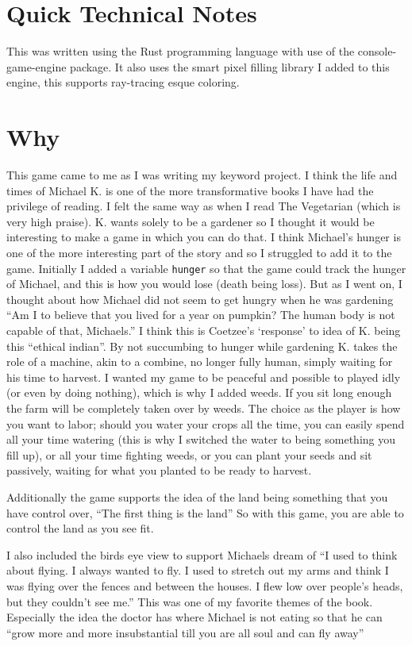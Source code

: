 \documentclass{article}
\begin{document}
\section*{Quick Technical Notes }
This was written using the Rust programming language with use of the console-game-engine package. It also uses the smart pixel filling library I added to this engine, this supports ray-tracing esque coloring.


\section*{Why}
This game came to me as I was writing my keyword project. I think the life and times of Michael K. is one of the more transformative books I have had the privilege of reading. I felt the same way as when I read The Vegetarian (which is very high praise).
K. wants solely to be a gardener so I thought it would be interesting to make a game in which you can do that. I think Michael's hunger is one of the more interesting part of the story and so I struggled to add it to the game. Initially I added a variable \lstinline[language=c]|hunger| so that the game could track the hunger of Michael, and this is how you would lose (death being loss). But as I went on, I thought about how Michael did not seem to get hungry when he was gardening ``Am I to believe that you lived for a year on pumpkin? The human body is not capable of that, Michaels.'' 
I think this is Coetzee's `response' to idea of K. being this ``ethical indian''. By not succumbing to hunger while gardening K. takes the role of a machine, akin to a combine, no longer fully human, simply waiting for his time to harvest. 
I wanted my game to be peaceful and possible to played idly (or even by doing nothing), which is why I added weeds. If you sit long enough the farm will be completely taken over by weeds. The choice as the player is how you want to labor; should you water your crops all the time, you can easily spend all your time watering (this is why I switched the water to being something you fill up), or all your time fighting weeds, or you can plant your seeds and sit passively, waiting for what you planted to be ready to harvest.

Additionally the game supports the idea of the land being something that you have control over, ``The first thing is the land'' So with this game, you are able to control the land as you see fit. 

I also included the birds eye view to support Michaels dream of ``I used to think about flying. I always wanted to fly. I used to stretch out my arms and think I was flying over the fences and between the houses. I flew low over people's heads, but they couldn't see me.'' This was one of my favorite themes of the book. Especially the idea the doctor has where Michael is not eating so that he can ``grow more and more insubstantial till you are all soul and can fly away'' 
\end{document}
